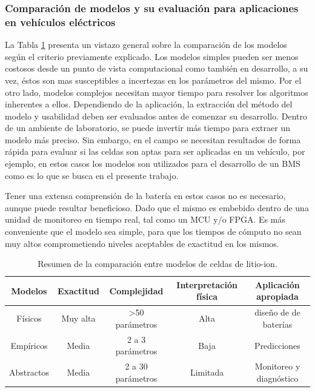 \documentclass[10pt,a4paper]{article}
\begin{document}
\subsubsection{Comparaci\'on de modelos y su evaluaci\'on para aplicaciones
en veh\'iculos el\'ectricos}\label{compModels}

\noindent La Tabla \ref{table_comp_models} presenta un vistazo general sobre la
comparaci\'on de los modelos seg\'un el criterio previamente explicado. Los
modelos simples pueden ser menos costosos desde un punto de vista computacional
como tambi\'en en desarrollo, a su vez, \'estos son mas susceptibles a
incertezas en los par\'ametros del mismo. Por el otro lado, modelos complejos
necesitan mayor tiempo para resolver los algoritmos inherentes a ellos.
Dependiendo de la aplicaci\'on, la extracci\'on del m\'etodo del modelo y
usabilidad deben ser evaluados antes de comenzar su desarrollo. 
Dentro de un ambiente de laboratorio, se puede invertir m\'as tiempo para 
extraer un modelo m\'as preciso. Sin embargo, en el campo se necesitan 
resultados de forma r\'apida para evaluar si las celdas son aptas para ser 
aplicadas en un veh\'iculo, por ejemplo, en estos casos los modelos son 
utilizados para el desarrollo de un \acrshort{BMS} como es lo que se busca en el 
presente trabajo. 

\noindent Tener una extensa comprensi\'on de la bater\'ia en estos casos no es
necesario, aunque puede resultar beneficioso. Dado que el mismo es embebido
dentro de una unidad de monitoreo en tiempo real, tal como un \acrshort{MCU} y/o
\acrshort{FPGA}. Es m\'as conveniente que el modelo sea simple, para que los
tiempos de c\'omputo no sean muy altos comprometiendo niveles aceptables de
exactitud en los mismos. 

\begin{table}[h!]
\begin{center}
\begin{tabular}{@{}ccccc@{}}
\textbf{Modelos} & \textbf{Exactitud} & \textbf{Complejidad} &
\textbf{Interpretaci\'on f\'isica} & \textbf{Aplicaci\'on apropiada}\\
\hline
F\'isicos   & Muy alta  & \textgreater{}50 par\'ametros         & Alta
& diseño de de bater\'ias \\\hline Emp\'iricos & Media 
& 2 a 3 par\'ametros & Baja & Predicciones\\ 
\hline Abstractos & Media & 2 a 30 par\'ametros & Limitada & 
Monitoreo y diagn\'ostico
\end{tabular}
\caption{Resumen de la comparaci\'on entre modelos de celdas de litio-ion.}
\label{table_comp_models}
\end{center}
\end{table}
\end{document}
